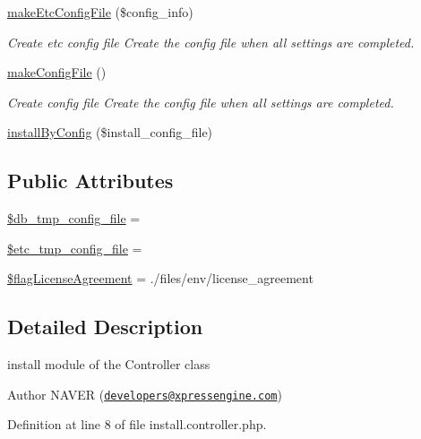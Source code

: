 \begin{DoxyCompactItemize}
\hyperlink{classinstallController_a87b331e263614e15c5366284648f6ee0}{make\+Etc\+Config\+File} (\$config\+\_\+info)
\begin{DoxyCompactList}\small\item\em Create etc config file Create the config file when all settings are completed. \end{DoxyCompactList}\item 
\hyperlink{classinstallController_a1ccad92dd450d67e90a2efdde0f6b78a}{make\+Config\+File} ()
\begin{DoxyCompactList}\small\item\em Create config file Create the config file when all settings are completed. \end{DoxyCompactList}\item 
\hyperlink{classinstallController_a4ec44b3090b73660ba018945c2ffa239}{install\+By\+Config} (\$install\+\_\+config\+\_\+file)
\end{DoxyCompactItemize}
\subsection*{Public Attributes}
\begin{DoxyCompactItemize}
\item 
\hyperlink{classinstallController_a1d32cf378279cb2b7d388b8a7e88c7aa}{\$db\+\_\+tmp\+\_\+config\+\_\+file} = \textquotesingle{}\textquotesingle{}
\item 
\hyperlink{classinstallController_a8e090f5c9a9844fbd8b4f0855a52dc43}{\$etc\+\_\+tmp\+\_\+config\+\_\+file} = \textquotesingle{}\textquotesingle{}
\item 
\hyperlink{classinstallController_af1f7a5fe91be6a576cdffcc07cba5be8}{\$flag\+License\+Agreement} = \textquotesingle{}./files/env/license\+\_\+agreement\textquotesingle{}
\end{DoxyCompactItemize}


\subsection{Detailed Description}
install module of the Controller class 

\begin{DoxyAuthor}{Author}
N\+A\+V\+E\+R (\href{mailto:developers@xpressengine.com}{\tt developers@xpressengine.\+com}) 
\end{DoxyAuthor}


Definition at line 8 of file install.\+controller.\+php.



